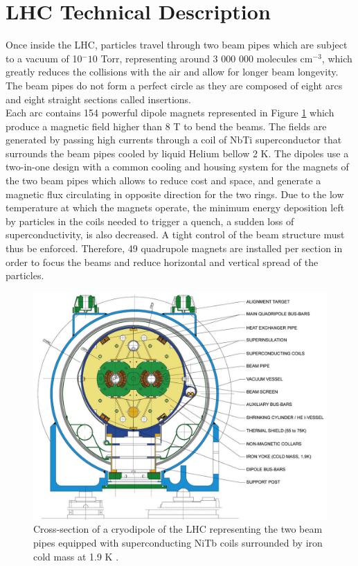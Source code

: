   \section{LHC Technical Description}

    Once inside the LHC, particles travel through two beam pipes which are subject to a vacuum of 10$^-{10}$ Torr, representing around 3 000 000 molecules cm$^{-3}$, which greatly reduces the collisions with the air and allow for longer beam longevity. The beam pipes do not form a perfect circle as they are composed of eight arcs and eight straight sections called insertions. \\

    Each arc contains 154 powerful dipole magnets represented in Figure \ref{fig:I-2-magnet} which produce a magnetic field higher than 8 T to bend the beams. The fields are generated by passing high currents through a coil of NbTi superconductor that surrounds the beam pipes cooled by liquid Helium bellow 2 K. The dipoles use a two-in-one design with a common cooling and housing system for the magnets of the two beam pipes which allows to reduce cost and space, and generate a magnetic flux circulating in opposite direction for the two rings. Due to the low temperature at which the magnets operate, the minimum energy deposition left by particles in the coils needed to trigger a quench, a sudden loss of superconductivity, is also decreased. A tight control of the beam structure must thus be enforced. Therefore, 49 quadrupole magnets are installed per section in order to focus the beams and reduce horizontal and vertical spread of the particles. \\

    \begin{figure}[h!]
			\centering
			\includegraphics[width=\textwidth]{img/I-2-LHC/magnet.jpg}
			\caption{Cross-section of a cryodipole of the LHC representing the two beam pipes equipped with superconducting NiTb coils surrounded by iron cold mass at 1.9 K \cite{Evans:2008zzb}.}
			\label{fig:I-2-magnet}
		\end{figure}

